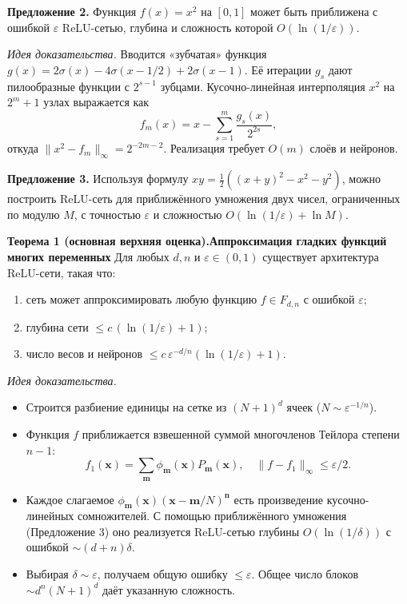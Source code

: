 \documentclass[12pt]{article}
\begin{document}
	
	\textbf{Предложение 2.} Функция \(f(x)=x^2\) на \([0,1]\) может быть приближена с ошибкой \(\varepsilon\) ReLU-сетью, глубина и сложность которой \(O(\ln(1/\varepsilon))\).
	
	\emph{Идея доказательства.}  
	Вводится «зубчатая» функция \(g(x)=2\sigma(x)-4\sigma(x-1/2)+2\sigma(x-1)\). Её итерации \(g_s\) дают пилообразные функции с \(2^{s-1}\) зубцами. Кусочно-линейная интерполяция \(x^2\) на \(2^m+1\) узлах выражается как  
	\[
	f_m(x)=x-\sum_{s=1}^m \frac{g_s(x)}{2^{2s}},
	\]  
	откуда \(\|x^2-f_m\|_\infty = 2^{-2m-2}\). Реализация требует \(O(m)\) слоёв и нейронов.
	
	\textbf{Предложение 3.} Используя формулу \(xy = \frac12((x+y)^2-x^2-y^2)\), можно построить ReLU-сеть для приближённого умножения двух чисел, ограниченных по модулю \(M\), с точностью \(\varepsilon\) и сложностью \(O(\ln(1/\varepsilon)+\ln M)\).

	
	\textbf{Теорема 1 (основная верхняя оценка).Аппроксимация гладких функций многих переменных}  
	Для любых \(d,n\) и \(\varepsilon\in(0,1)\) существует архитектура ReLU-сети, такая что:
	\begin{enumerate}
		\item сеть может аппроксимировать любую функцию \(f\in F_{d,n}\) с ошибкой \(\varepsilon\);
		\item глубина сети \(\le c\,(\ln(1/\varepsilon)+1)\);
		\item число весов и нейронов \(\le c\,\varepsilon^{-d/n}(\ln(1/\varepsilon)+1)\).
	\end{enumerate}
	
	\emph{Идея доказательства.}  
	\begin{itemize}
		\item Строится разбиение единицы на сетке из \((N+1)^d\) ячеек (\(N\sim\varepsilon^{-1/n}\)).
		\item Функция \(f\) приближается взвешенной суммой многочленов Тейлора степени \(n-1\):  
		\[
		f_1(\mathbf{x}) = \sum_{\mathbf{m}} \phi_{\mathbf{m}}(\mathbf{x}) P_{\mathbf{m}}(\mathbf{x}),\quad \|f-f_1\|_\infty \le \varepsilon/2.
		\]
		\item Каждое слагаемое \(\phi_{\mathbf{m}}(\mathbf{x})(\mathbf{x}-\mathbf{m}/N)^{\mathbf{n}}\) есть произведение кусочно-линейных сомножителей. С помощью приближённого умножения (Предложение 3) оно реализуется ReLU-сетью глубины \(O(\ln(1/\delta))\) с ошибкой \(\sim (d+n)\delta\).
		\item Выбирая \(\delta\sim\varepsilon\), получаем общую ошибку \(\le\varepsilon\). Общее число блоков \(\sim d^n(N+1)^d\) даёт указанную сложность.
	\end{itemize}
	
\end{document}
